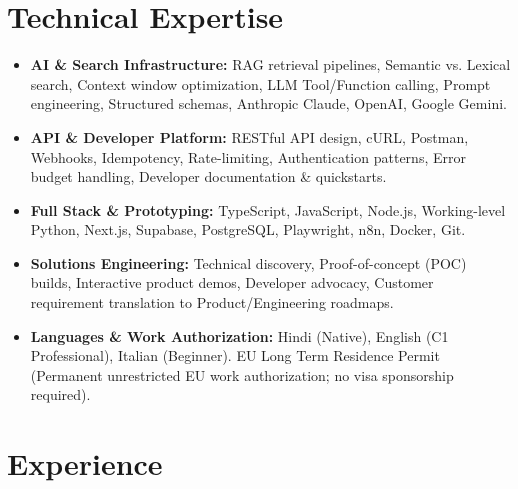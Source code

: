 \documentclass[10pt,a4paper]{article}
\begin{document}
\section{Technical Expertise}
\begin{itemize}
  \item \textbf{AI \& Search Infrastructure:} RAG retrieval pipelines, Semantic vs. Lexical search, Context window optimization, LLM Tool/Function calling, Prompt engineering, Structured schemas, Anthropic Claude, OpenAI, Google Gemini.
  \item \textbf{API \& Developer Platform:} RESTful API design, cURL, Postman, Webhooks, Idempotency, Rate-limiting, Authentication patterns, Error budget handling, Developer documentation \& quickstarts.
  \item \textbf{Full Stack \& Prototyping:} TypeScript, JavaScript, Node.js, Working-level Python, Next.js, Supabase, PostgreSQL, Playwright, n8n, Docker, Git.
  \item \textbf{Solutions Engineering:} Technical discovery, Proof-of-concept (POC) builds, Interactive product demos, Developer advocacy, Customer requirement translation to Product/Engineering roadmaps.
  \item \textbf{Languages \& Work Authorization:} Hindi (Native), English (C1 Professional), Italian (Beginner). EU Long Term Residence Permit (Permanent unrestricted EU work authorization; no visa sponsorship required).
\end{itemize}

\section{Experience}
\end{document}
